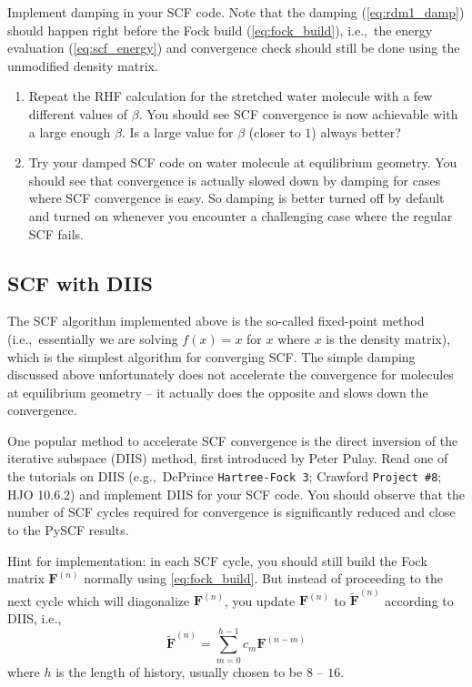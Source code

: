\documentclass[parskip=full]{article}
\begin{document}
    Implement damping in your SCF code.
    Note that the damping (\ref{eq:rdm1_damp}) should happen right before the Fock build (\ref{eq:fock_build}), i.e.,~the energy evaluation (\ref{eq:scf_energy}) and convergence check should still be done using the unmodified density matrix.

    \begin{enumerate}
        \item Repeat the RHF calculation for the stretched water molecule with a few different values of $\beta$.
        You should see SCF convergence is now achievable with a large enough $\beta$.
        Is a large value for $\beta$ (closer to $1$) always better?
        \item Try your damped SCF code on water molecule at equilibrium geometry.
        You should see that convergence is actually slowed down by damping for cases where SCF convergence is easy.
        So damping is better turned off by default and turned on whenever you encounter a challenging case where the regular SCF fails.
    \end{enumerate}


    \subsection{SCF with DIIS}
    \label{subsec:hf_diis}

    The SCF algorithm implemented above is the so-called fixed-point method (i.e.,~essentially we are solving $f(x) = x$ for $x$ where $x$ is the density matrix), which is the simplest algorithm for converging SCF.
    The simple damping discussed above unfortunately does not accelerate the convergence for molecules at equilibrium geometry -- it actually does the opposite and slows down the convergence.

    One popular method to accelerate SCF convergence is the direct inversion of the iterative subspace (DIIS) method, first introduced by Peter Pulay.
    Read one of the tutorials on DIIS (e.g.,~DePrince \texttt{Hartree-Fock 3}; Crawford \texttt{Project \#8}; HJO 10.6.2) and implement DIIS for your SCF code.
    You should observe that the number of SCF cycles required for convergence is significantly reduced and close to the PySCF results.

    Hint for implementation: in each SCF cycle, you should still build the Fock matrix $\mathbf{F}^{(n)}$ normally using \cref{eq:fock_build}.
    But instead of proceeding to the next cycle which will diagonalize $\mathbf{F}^{(n)}$, you update $\mathbf{F}^{(n)}$ to $\tilde{\mathbf{F}}^{(n)}$ according to DIIS, i.e.,
    \begin{equation}
        \tilde{\mathbf{F}}^{(n)}
            = \sum_{m = 0}^{h-1} c_{m} \mathbf{F}^{(n-m)}
    \end{equation}
    where $h$ is the length of history, usually chosen to be $8$ -- $16$.
\end{document}
